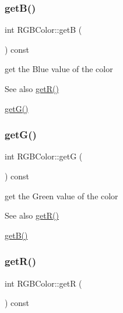 \subsubsection{\texorpdfstring{get\+B()}{getB()}}
{\footnotesize\ttfamily int R\+G\+B\+Color\+::getB (\begin{DoxyParamCaption}{ }\end{DoxyParamCaption}) const}



get the Blue value of the color 

\begin{DoxySeeAlso}{See also}
\mbox{\hyperlink{class_r_g_b_color_af5bd4f8e515758345c1d41bbf787bf0f}{get\+R()}} 

\mbox{\hyperlink{class_r_g_b_color_a1d8c10aec49393fa8ed68b137352ef19}{get\+G()}} 
\end{DoxySeeAlso}
\mbox{\label{class_r_g_b_color_a1d8c10aec49393fa8ed68b137352ef19}} 
\subsubsection{\texorpdfstring{get\+G()}{getG()}}
{\footnotesize\ttfamily int R\+G\+B\+Color\+::getG (\begin{DoxyParamCaption}{ }\end{DoxyParamCaption}) const}



get the Green value of the color 

\begin{DoxySeeAlso}{See also}
\mbox{\hyperlink{class_r_g_b_color_af5bd4f8e515758345c1d41bbf787bf0f}{get\+R()}} 

\mbox{\hyperlink{class_r_g_b_color_a55500b063148c853e65eb5b420eb4887}{get\+B()}} 
\end{DoxySeeAlso}
\mbox{\label{class_r_g_b_color_af5bd4f8e515758345c1d41bbf787bf0f}} 
\subsubsection{\texorpdfstring{get\+R()}{getR()}}
{\footnotesize\ttfamily int R\+G\+B\+Color\+::getR (\begin{DoxyParamCaption}{ }\end{DoxyParamCaption}) const}



